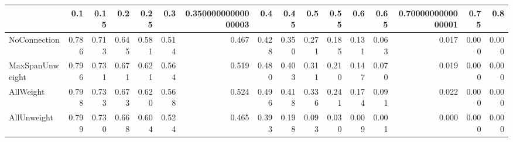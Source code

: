 \begin{tabular}{lrrrrrrrrrrrrrrr}
\toprule
{} &   0.1 &  0.15 &   0.2 &  0.25 &   0.3 & 0.35000000000000003 &   0.4 &  0.45 &   0.5 &  0.55 &   0.6 &  0.65 & 0.7000000000000001 &  0.75 &   0.8 \\
\midrule
NoConnection    & 0.786 & 0.713 & 0.645 & 0.581 & 0.514 &               0.467 & 0.428 & 0.350 & 0.271 & 0.185 & 0.131 & 0.063 &              0.017 & 0.000 & 0.000 \\
MaxSpanUnweight & 0.796 & 0.731 & 0.671 & 0.621 & 0.564 &               0.519 & 0.480 & 0.403 & 0.311 & 0.210 & 0.147 & 0.070 &              0.019 & 0.000 & 0.000 \\
AllWeight       & 0.798 & 0.733 & 0.673 & 0.620 & 0.568 &               0.524 & 0.496 & 0.418 & 0.336 & 0.241 & 0.174 & 0.091 &              0.022 & 0.000 & 0.000 \\
AllUnweight     & 0.799 & 0.730 & 0.668 & 0.604 & 0.524 &               0.465 & 0.393 & 0.198 & 0.093 & 0.030 & 0.009 & 0.001 &              0.000 & 0.000 & 0.000 \\
\bottomrule
\end{tabular}
